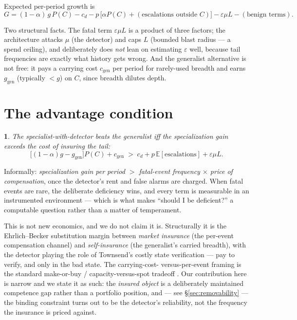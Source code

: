 \documentclass[11pt]{article}
\theoremstyle{plain}
\newtheorem*{namedthminner}{\namedthmname}
\newenvironment{nthm}[1]{\def\namedthmname{#1}\begin{namedthminner}}{\end{namedthminner}}
\theoremstyle{definition}
\begin{document}
Expected per-period growth is
$$G = (1-\alpha)\,g\,P(C) - c_d - p\,\big[\alpha P(C) + (\text{escalations outside } C)\big] - \varepsilon\mu L - (\text{benign terms}).$$

Two structural facts. The fatal term $\varepsilon\mu L$ is a product of three
factors; the architecture attacks $\mu$ (the detector) and caps $L$ (bounded
blast radius --- a spend ceiling), and deliberately does \emph{not} lean on
estimating $\varepsilon$ well, because tail frequencies are exactly what
history gets wrong. And the generalist alternative is not free: it pays a
carrying cost $c_{\text{gen}}$ per period for rarely-used breadth and earns
$g_{\text{gen}}$ (typically $< g$) on
$C$, since breadth dilutes depth.

\section{The advantage condition}\label{sec:advantage}

\begin{nthm}{Proposition 1}
The specialist-with-detector beats the generalist iff the
specialization gain exceeds the cost of insuring the tail:
$$\big[(1-\alpha)g - g_{\text{gen}}\big] P(C) + c_{\text{gen}} \;>\; c_d + p\,\mathbb{E}[\text{escalations}] + \varepsilon\mu L.$$
\end{nthm}

Informally: \emph{specialization gain per period $>$ fatal-event frequency $\times$ price of
compensation}, once the detector's rent and false alarms are charged. When
fatal events are rare, the deliberate deficiency wins, and every term is
measurable in an instrumented environment --- which is what makes ``should I be
deficient?'' a computable question rather than a matter of temperament.

This is not new economics, and we do not claim it is. Structurally it is the
Ehrlich--Becker \citeyearpar{ehrlich1972} substitution margin between \emph{market insurance} (the
per-event compensation channel) and \emph{self-insurance} (the generalist's carried
breadth), with the detector playing the role of Townsend's \citeyearpar{townsend1979} costly state
verification --- pay to verify, and only in the bad state. The carrying-cost-
versus-per-event framing is the standard make-or-buy / capacity-versus-spot
tradeoff \citep{williamson1985,vanmieghem2003}. Our contribution here is narrow and
we state it as such: the \emph{insured object} is a deliberately maintained
competence gap rather than a portfolio position, and --- see \S\ref{sec:removability} --- the binding
constraint turns out to be the detector's reliability, not the frequency the
insurance is priced against.
\end{document}
